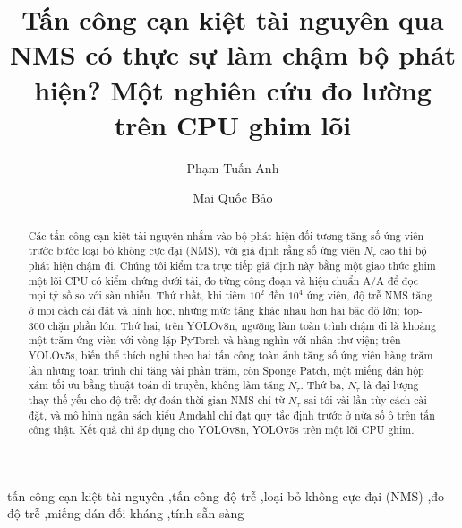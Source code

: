 \documentclass[a4paper,fleqn]{cas-dc}
\newcommand{\todo}[1]{\textcolor{red}{[TODO: #1]}}
\newcommand{\Ntau}{N_{\tau}}
\begin{document}
\let\WriteBookmarks\relax
\def\floatpagepagefraction{1}
\def\textpagefraction{.001}
\title[mode=title]{Tấn công cạn kiệt tài nguyên qua NMS có thực sự làm chậm bộ phát hiện? Một nghiên cứu đo lường trên CPU ghim lõi}
\author[1]{Phạm Tuấn Anh}
\author[1]{Mai Quốc Bảo}
\nonumnote{Tác giả liên hệ, email liên hệ và ORCID: \todo{nhóm quyết định}.}

\begin{abstract}
Các tấn công cạn kiệt tài nguyên nhắm vào bộ phát hiện đối tượng tăng số ứng viên trước bước loại bỏ không cực đại (NMS), với giả định rằng số ứng viên $\Ntau$ cao thì bộ phát hiện chậm đi. Chúng tôi kiểm tra trực tiếp giả định này bằng một giao thức ghim một lõi CPU có kiểm chứng dưới tải, đo từng công đoạn và hiệu chuẩn A/A để đọc mọi tỷ số so với sàn nhiễu. Thứ nhất, khi tiêm $10^2$ đến $10^4$ ứng viên, độ trễ NMS tăng ở mọi cách cài đặt và hình học, nhưng mức tăng khác nhau hơn hai bậc độ lớn; top-300 chặn phần lớn. Thứ hai, trên YOLOv8n, ngưỡng làm toàn trình chậm đi là khoảng một trăm ứng viên với vòng lặp PyTorch và hàng nghìn với nhân thư viện; trên YOLOv5s, biến thể thích nghi theo hai tấn công toàn ảnh tăng số ứng viên hàng trăm lần nhưng toàn trình chỉ tăng vài phần trăm, còn Sponge Patch, một miếng dán hộp xám tối ưu bằng thuật toán di truyền, không làm tăng $\Ntau$. Thứ ba, $\Ntau$ là đại lượng thay thế yếu cho độ trễ: dự đoán thời gian NMS chỉ từ $\Ntau$ sai tới vài lần tùy cách cài đặt, và mô hình ngân sách kiểu Amdahl chỉ đạt quy tắc định trước ở nửa số ô trên tấn công thật. Kết quả chỉ áp dụng cho YOLOv8n, YOLOv5s trên một lõi CPU ghim.
\end{abstract}

\begin{keywords}[Từ khóa]
tấn công cạn kiệt tài nguyên \sep tấn công độ trễ \sep loại bỏ không cực đại (NMS) \sep đo độ trễ \sep miếng dán đối kháng \sep tính sẵn sàng
\end{keywords}
\maketitle
\end{document}
